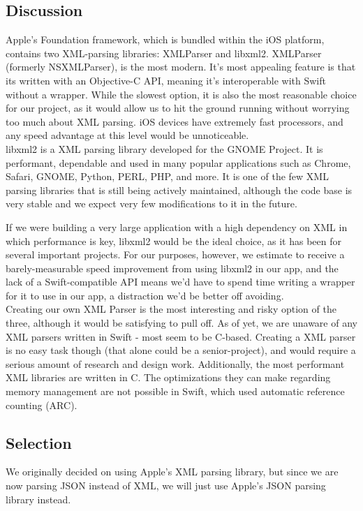 \documentclass[letterpaper,10pt,titlepage]{article}
\begin{document}
\subsection{Discussion}
Apple’s Foundation framework, which is bundled within the iOS platform, contains two XML-parsing libraries: XMLParser and libxml2. XMLParser (formerly NSXMLParser), is the most modern. It’s most appealing feature is that its written with an Objective-C API, meaning it’s interoperable with Swift without a wrapper. While the slowest option, it is also the most reasonable choice for our project, as it would allow us to hit the ground running without worrying too much about XML parsing. iOS devices have extremely fast processors, and any speed advantage at this level would be unnoticeable.\\

libxml2 is a XML parsing library developed for the GNOME Project\cite{parsingpara1}. It is performant, dependable and used in many popular applications such as Chrome, Safari\cite{parsingpara2}, GNOME, Python, PERL, PHP, and more. It is one of the few XML parsing libraries that is still being actively maintained, although the code base is very stable and we expect very few modifications to it in the future.

If we were building a very large application with a high dependency on XML in which performance is key, libxml2 would be the ideal choice, as it has been for several important projects. For our purposes, however, we estimate to receive a barely-measurable speed improvement from using libxml2 in our app, and the lack of a Swift-compatible API means we’d have to spend time writing a wrapper for it to use in our app, a distraction we’d be better off avoiding.\\

Creating our own XML Parser is the most interesting and risky option of the three, although it would be satisfying to pull off. As of yet, we are unaware of any XML parsers written in Swift - most seem to be C-based. Creating a XML parser is no easy task though (that alone could be a senior-project), and would require a serious amount of research and design work. Additionally, the most performant XML libraries are written in C. The optimizations they can make regarding memory management are not possible in Swift, which used automatic reference counting (ARC).\\

\subsection{Selection}
We originally decided on using Apple's XML parsing library, but since we are now parsing JSON instead of XML, we will just use Apple's JSON parsing library instead.\\
\end{document}
